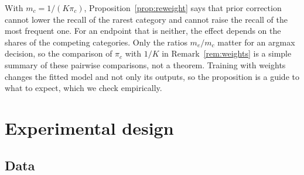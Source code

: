 \documentclass[pdflatex,sn-mathphys-ay]{sn-jnl}
\theoremstyle{thmstyleone}
\theoremstyle{thmstylethree}
\begin{document}
With $m_c=1/(K\pi_c)$, Proposition~\ref{prop:reweight} says that prior correction cannot lower the recall of the rarest category and cannot raise the recall of the most frequent one. For an endpoint that is neither, the effect depends on the shares of the competing categories. Only the ratios $m_e/m_c$ matter for an argmax decision, so the comparison of $\pi_c$ with $1/K$ in Remark~\ref{rem:weights} is a simple summary of these pairwise comparisons, not a theorem. Training with weights changes the fitted model and not only its outputs, so the proposition is a guide to what to expect, which we check empirically.

\section{Experimental design}\label{sec:design}

\subsection{Data}\label{sec:data}
\end{document}
